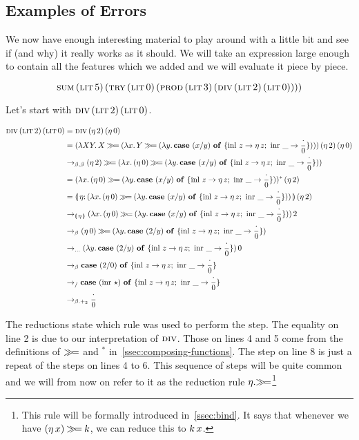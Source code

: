 \subsection{Examples of Errors}

We now have enough interesting material to play around with a little bit
and see if (and why) it really works as it should. We will take an
expression large enough to contain all the features which we added and we
will evaluate it piece by piece.

$$
\textsc{sum}\,(\textsc{lit}\,5)\,(\textsc{try}\,(\textsc{lit}\,0)\,(\textsc{prod}\,(\textsc{lit}\,3)\,(\textsc{div}\,(\textsc{lit}\,2)\,(\textsc{lit}\,0))))
$$

Let's start with $\textsc{div}\,(\textsc{lit}\,2)\,(\textsc{lit}\,0)$.

\begin{align}
  \app{\dive}{\litec{2}}{\litec{0}}
  &= \app{\dive}{(\ap{\eta}{2})}
                {(\ap{\eta}{0})} \\
  &= \app{(\lam{X Y}{X \hsbind (\lam{x}{Y \hsbind (\lam{y}
          {\case{(x / y)}{z}{\ap{\eta}{z}}{\_}{\dbze}})})})}
                {(\ap{\eta}{2})} {(\ap{\eta}{0})} \\
  &\to_{\beta,\beta} (\ap{\eta}{2}) \hsbind (\lam{x}{(\ap{\eta}{0}) \hsbind (\lam{y}
          {\case{(x / y)}{z}{\ap{\eta}{z}}{\_}{\dbze}})}) \\
  &= \ap{(\lam{x}{(\ap{\eta}{0}) \hsbind (\lam{y}
          {\case{(x / y)}{z}{\ap{\eta}{z}}{\_}{\dbze}})})^*}{(\ap{\eta}{2})} \\
  &= \ap{\banana{\onto{\eta}{(\lam{x}{(\ap{\eta}{0}) \hsbind (\lam{y}
          {\case{(x / y)}{z}{\ap{\eta}{z}}{\_}{\dbze}})})}}}{(\ap{\eta}{2})} \\
  &\to_{\banana{\eta}} \ap{(\lam{x}{(\ap{\eta}{0}) \hsbind (\lam{y}
          {\case{(x / y)}{z}{\ap{\eta}{z}}{\_}{\dbze}})})}{2} \\
  &\to_{\beta} (\ap{\eta}{0}) \hsbind (\lam{y}
          {\case{(2 / y)}{z}{\ap{\eta}{z}}{\_}{\dbze}}) \\
  &\to_{\ldots} \ap{(\lam{y}{\case{(2 / y)}{z}{\ap{\eta}{z}}{\_}{\dbze}})}{0} \\
  &\to_{\beta} \case{(2 / 0)}{z}{\ap{\eta}{z}}{\_}{\dbze} \\
  &\to_{/} \case{(\ap{\inr}{\star})}{z}{\ap{\eta}{z}}{\_}{\dbze} \\
  &\to_{\beta.+_2} \dbze
\end{align}
\setcounter{equation}{0}

The reductions state which rule was used to perform the step. The equality
on line 2 is due to our interpretation of $\textsc{div}$. Those on lines 4 and 5
come from the definitions of $\mathbin{\gg\!=}$ and $^*$
in~\ref{ssec:composing-functions}. The step on line 8 is just a repeat of
the steps on lines 4 to 6. This sequence of steps will be quite common and
we will from now on refer to it as the reduction rule
$\eta.\mathbin{\gg\!=}$\footnote{This rule will be formally introduced
  in~\ref{ssec:bind}. It says that whenever we have
  $(\eta\,x) \mathbin{\gg\!=} k$, we can reduce this to $k\,x$.}

